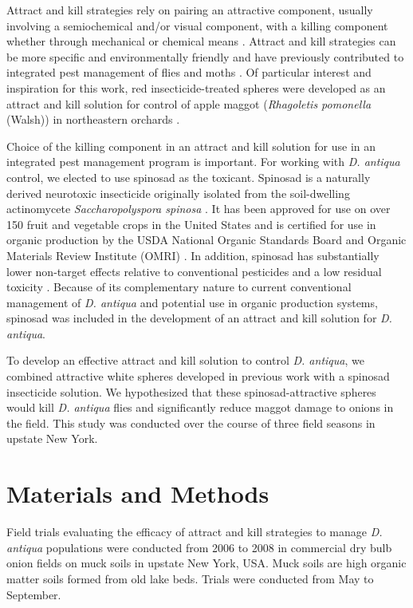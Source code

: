 \documentclass[alpha-refs]{wiley-article}
\begin{document}
Attract and kill strategies rely on pairing an attractive component, usually involving a semiochemical and/or visual component, with a killing component whether through mechanical or chemical means \citep{gregg2018advances}.  Attract and kill strategies can be more specific and environmentally friendly and have previously contributed to integrated pest management of flies and moths \citep{gregg2018advances}.  Of particular interest and inspiration for this work, red insecticide-treated spheres were developed as an attract and kill solution for control of apple maggot (\textit{Rhagoletis pomonella} (Walsh)) in northeastern orchards \citep{bostanian2001attract,duan1995control}.  

Choice of the killing component in an attract and kill solution for use in an integrated pest management program is important. For working with \textit{D. antiqua} control, we elected to use spinosad as the toxicant. Spinosad is a naturally derived neurotoxic insecticide originally isolated from the soil-dwelling actinomycete \textit{Saccharopolyspora spinosa} \citep{racke2007reduced}. It has been approved for use on over 150 fruit and vegetable crops in the United States and is certified for use in organic production by the USDA National Organic Standards Board and Organic Materials Review Institute (OMRI) \citep{racke2007reduced,williams2003naturally}. In addition, spinosad has substantially lower non-target effects relative to conventional pesticides and a low residual toxicity \citep{williams2003naturally}. Because of its complementary nature to current conventional management of \textit{D. antiqua} and potential use in organic production systems, spinosad was included in the development of an attract and kill solution for \textit{D. antiqua}.

To develop an effective attract and kill solution to control \textit{D. antiqua}, we combined attractive white spheres developed in previous work \citep{willett2019} with a spinosad insecticide solution. We hypothesized that these spinosad-attractive spheres would kill \textit{D. antiqua} flies and significantly reduce maggot damage to onions in the field. This study was conducted over the course of three field seasons in upstate New York.

\section{Materials and Methods}

Field trials evaluating the efficacy of attract and kill strategies to manage \textit{D. antiqua} populations were conducted from 2006 to 2008 in commercial dry bulb onion fields on muck soils in upstate New York, USA.  Muck soils are high organic matter soils formed from old lake beds.  Trials were conducted from May to September.  
\end{document}
